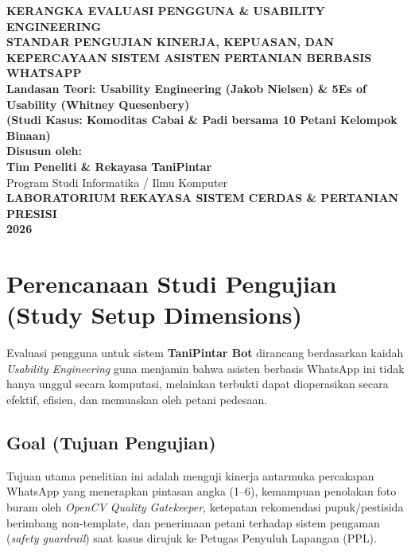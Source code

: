 \documentclass[11pt,a4paper]{article}
\begin{document}
\begin{titlepage}
    \centering
    \vspace*{1.2cm}
    {\Large \textbf{KERANGKA EVALUASI PENGGUNA \& USABILITY ENGINEERING}}\\[0.6cm]
    {\LARGE \textbf{STANDAR PENGUJIAN KINERJA, KEPUASAN, DAN KEPERCAYAAN SISTEM ASISTEN PERTANIAN BERBASIS WHATSAPP}}\\[0.5cm]
    {\large \textbf{Landasan Teori: Usability Engineering (Jakob Nielsen) \& 5Es of Usability (Whitney Quesenbery)}}\\[0.3cm]
    {\normalsize \textbf{(Studi Kasus: Komoditas Cabai \& Padi bersama 10 Petani Kelompok Binaan)}}\\[2.2cm]

    \textbf{Disusun oleh:}\\
    {\large \textbf{Tim Peneliti \& Rekayasa TaniPintar}}\\[0.3cm]
    Program Studi Informatika / Ilmu Komputer\\[2.5cm]

    \vfill
    {\large \textbf{LABORATORIUM REKAYASA SISTEM CERDAS \& PERTANIAN PRESISI}}\\[0.2cm]
    {\large \textbf{2026}}
\end{titlepage}

\newpage
\tableofcontents
\newpage

\section{Perencanaan Studi Pengujian (Study Setup Dimensions)}

Evaluasi pengguna untuk sistem \textbf{TaniPintar Bot} dirancang berdasarkan kaidah \textit{Usability Engineering} guna menjamin bahwa asisten berbasis WhatsApp ini tidak hanya unggul secara komputasi, melainkan terbukti dapat dioperasikan secara efektif, efisien, dan memuaskan oleh petani pedesaan.

\subsection{Goal (Tujuan Pengujian)}
Tujuan utama penelitian ini adalah menguji kinerja antarmuka percakapan WhatsApp yang menerapkan pintasan angka (1--6), kemampuan penolakan foto buram oleh \textit{OpenCV Quality Gatekeeper}, ketepatan rekomendasi pupuk/pestisida berimbang non-template, dan penerimaan petani terhadap sistem pengaman (\textit{safety guardrail}) saat kasus dirujuk ke Petugas Penyuluh Lapangan (PPL).
\end{document}
